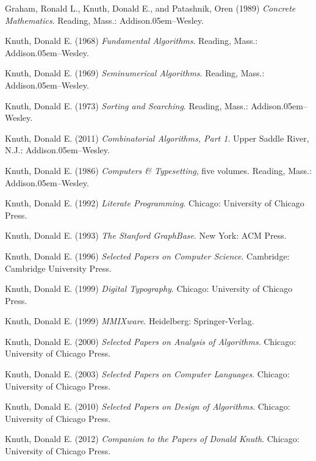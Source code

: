 \bib
Graham, Ronald L., Knuth, Donald E., and Patashnik, Oren (1989) {\sl
Concrete Mathematics}. Reading, Mass.: Addison\kern.05em--Wesley.

\medskip
\bib
Knuth, Donald E. (1968) {\sl Fundamental Algorithms}. Reading, Mass.:
Addison\kern.05em--Wesley.

\medskip
\bib
Knuth, Donald E. (1969) {\sl Seminumerical Algorithms}. Reading, Mass.:
Addison\kern.05em--Wesley.

\medskip
\bib
Knuth, Donald E. (1973) {\sl Sorting and Searching}. Reading, Mass.:
Addison\kern.05em--Wesley.

\medskip
\bib
Knuth, Donald E. (2011) {\sl Combinatorial Algorithms, Part 1}.
Upper Saddle River, N.J.: Addison\kern.05em--Wesley.

\medskip
\bib
Knuth, Donald E. (1986) {\sl Computers \& Typesetting}, five volumes.
Reading, Mass.: Addison\kern.05em--Wesley.

\medskip
\bib
Knuth, Donald E. (1992) {\sl Literate Programming}.
Chicago: University of Chicago Press.

\medskip
\bib
Knuth, Donald E. (1993) {\sl The Stanford GraphBase}.
New York: ACM Press.

\medskip
\bib
Knuth, Donald E. (1996) {\sl Selected Papers on Computer Science}.
Cambridge: Cambridge University Press.

\medskip
\bib
Knuth, Donald E. (1999) {\sl Digital Typography}.
Chicago: University of Chicago Press.

\medskip
Knuth, Donald E. (1999) {\sl MMIXware}.
Heidelberg: Springer-Verlag.

\medskip
\bib
Knuth, Donald E. (2000) {\sl Selected Papers on Analysis of Algorithms}.
Chicago: University of Chicago Press.

\medskip
\bib
Knuth, Donald E. (2003) {\sl Selected Papers on Computer Languages}.
Chicago: University of Chicago Press.

\medskip
\bib
Knuth, Donald E. (2010) {\sl Selected Papers on Design of Algorithms}.
Chicago: University of Chicago Press.

\medskip
\bib
Knuth, Donald E. (2012) {\sl Companion to the Papers of Donald Knuth}.
Chicago: University of Chicago Press.

\bye
